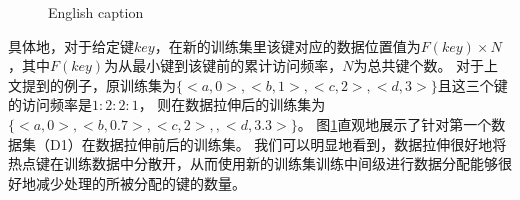 
\begin{figure}[!htp]
  \centering
    {English caption}
  \label{fig:stretch}
\end{figure}

具体地，对于给定键$key$，在新的训练集里该键对应的数据位置值为$F(key) \times N$，其中$F(key)$为从最小键到该键前的累计访问频率，$N$为总共键个数。
对于上文提到的例子，原训练集为$\{<a, 0>, <b, 1>, <c, 2>, <d, 3>\}$且这三个键的访问频率是$1:2:2:1$，
则在数据拉伸后的训练集为$\{<a, 0>, <b, 0.7>, <c, 2>, , <d, 3.3>\}$。
图\ref{fig:stretch}直观地展示了针对第一个数据集（D1）在数据拉伸前后的训练集。
我们可以明显地看到，数据拉伸很好地将热点键在训练数据中分散开，从而使用新的训练集训练中间级{\model}进行数据分配能够很好地减少处理{\hotkey}的{\model}所被分配的键的数量。


